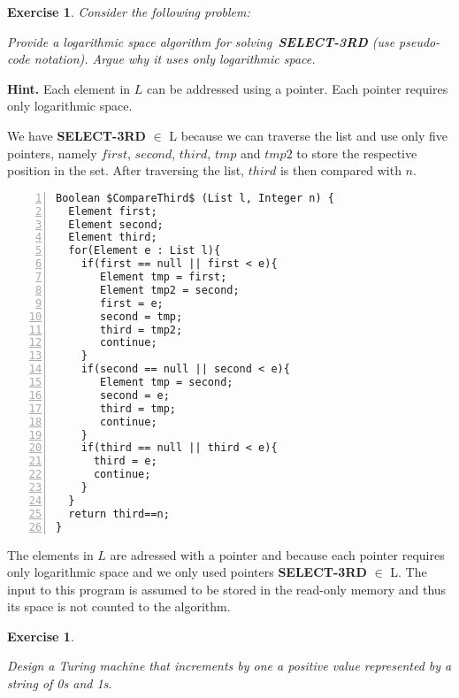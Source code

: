 \documentclass [11pt]{article}
\newtheorem{exercise}[theorem]{Exercise}
\newcommand{\solution}[1]{\noindent {\bf Solution.}  #1}
\begin{document}
\newpage

\begin{exercise}
  Consider the following problem:

  \begin{center}
  \end{center}


  \medskip Provide a logarithmic space algorithm for
  solving~\textbf{SELECT-3RD} (use pseudo-code notation). Argue why it
  uses only logarithmic space.
\end{exercise}
\noindent \textbf{Hint.} Each element in $L$ can be addressed using a
pointer. Each pointer requires only logarithmic space.


\solution{
We have \textbf{SELECT-3RD} $\in$ L because we can traverse the list and use only five pointers, namely $first$, $second$, $third$, $tmp$ and $tmp2$ to store the respective
position in the set. After traversing the list, $third$ is then compared with $n$.}
\begin{lstlisting}[label=haltingtodouble,caption=CompareThird,mathescape, numbers=left, numberstyle=\tiny]
Boolean $CompareThird$ (List l, Integer n) {
  Element first;
  Element second;
  Element third;
  for(Element e : List l){
    if(first == null || first < e){
       Element tmp = first;
       Element tmp2 = second;
       first = e;
       second = tmp;
       third = tmp2;
       continue;
    }
    if(second == null || second < e){
       Element tmp = second;
       second = e;
       third = tmp;
       continue;
    }
    if(third == null || third < e){
      third = e;
      continue;
    }
  }
  return third==n;
}
\end{lstlisting}
The elements in $L$ are adressed with a pointer and because each pointer requires only logarithmic space and we only used pointers \textbf{SELECT-3RD} $\in$ L. 
The input to this program is assumed to be stored in the read-only memory and thus its space is not counted to the algorithm.


\begin{exercise}
  \label{ex:turing}

  Design a Turing machine that increments by one a positive value represented by a string of 0s and 1s.

\end{exercise}
\end{document}
